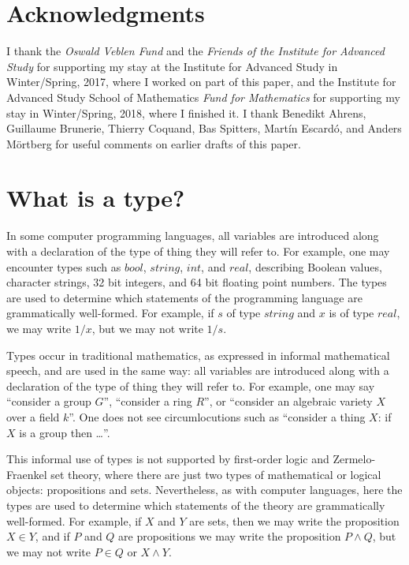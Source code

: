 \documentclass[letter,12pt]{amsart}
\theoremstyle{definition}
\theoremstyle{remark}
\numberwithin{equation}{section}
\begin{document}
\section*{Acknowledgments}

I thank the {\em Oswald Veblen Fund} and the {\em Friends of the Institute for Advanced Study} for supporting my stay at the Institute for
Advanced Study in Winter/Spring, 2017, where I worked on part of this paper, and the Institute for Advanced Study School of Mathematics {\em
  Fund for Mathematics} for supporting my stay in Winter/Spring, 2018, where I finished it.  I thank Benedikt Ahrens, Guillaume Brunerie, 
Thierry Coquand, Bas Spitters,  Mart\'in Escard\'o, and Anders M\"ortberg for useful comments on earlier drafts of this paper.

\section{What is a type?}

In some computer programming languages, all variables are introduced along with a declaration of the type of thing they will refer to.  For example,
one may encounter types such as $bool$, $string$, $int$, and $real$, describing Boolean values, character strings, 32 bit integers, and 64 bit
floating point numbers.  The types are used to determine which statements of the programming language are grammatically well-formed.
For example, if $s$ of type $string$ and $x$ is of type $real$, we may write $1/x$, but we may not write $1/s$.

Types occur in traditional mathematics, as expressed in informal mathematical speech, and are used in the same way: all variables are introduced
along with a declaration of the type of thing they will refer to.  For example, one may say ``consider a group $G$'', ``consider a ring $R$'',
or ``consider an algebraic variety $X$ over a field $k$''.  One does not see circumlocutions such as ``consider a thing $X$: if $X$ is a group
then \dots''.

This informal use of types is not supported by first-order logic and Zermelo-Fraenkel set theory, where there are just two types of mathematical
or logical objects: propositions and sets.  Nevertheless, as with computer languages, here the types are used to determine which statements of
the theory are grammatically well-formed.  For example, if $X$ and $Y$ are sets, then we may write the proposition $X \in Y$, and if $P$ and $Q$
are propositions we may write the proposition $P \wedge Q$, but we may not write $P \in Q$ or $X \wedge Y$.
\end{document}
